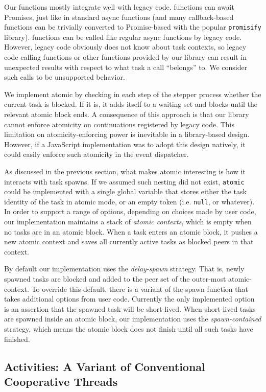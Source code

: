 \documentclass[acmsmall,anonymous,review]{acmart}\settopmatter{printfolios=true,printccs=false,printacmref=false}
\begin{document}
Our \asyncs{} functions mostly integrate well with legacy code.
\asyncs{} functions can await Promises, just like in standard async functions (and many callback-based functions can be trivially converted to Promise-based with the popular \texttt{promisify} library).
\asyncs{} functions can be called like regular async functions by legacy code.
However, legacy code obviously does not know about task contexts, so legacy code calling \asyncs{} functions or other functions provided by our library can result in unexpected results with respect to what task a call ``belongs'' to.
We consider such calls to be unsupported behavior.

We implement atomic by checking in each step of the stepper process whether the current task is blocked.
If it is, it adds itself to a waiting set and blocks until the relevant atomic block ends.
A consequence of this approach is that our library cannot enforce atomicity on continuations registered by legacy code.
This limitation on atomicity-enforcing power is inevitable in a library-based design.
However, if a JavaScript implementation was to adopt this design natively, it could easily enforce such atomicity in the event dispatcher.

As discussed in the previous section, what makes atomic interesting is how it interacts with task spawns.
If we assumed such nesting did not exist, \texttt{atomic} could be implemented with a single global variable that stores either the task identity of the task in atomic mode, or an empty token (i.e. \texttt{null}, or whatever).
In order to support a range of options, depending on choices made by user code, our implementation maintains a stack of \emph{atomic contexts}, which is empty when no tasks are in an atomic block.
When a task enters an atomic block, it pushes a new atomic context and saves all currently active tasks as blocked peers in that context.

By default our implementation uses the \emph{delay-spawn} strategy.
That is, newly spawned tasks are blocked and added to the peer set of the outer-most atomic-context.
To override this default, there is a variant of the spawn function that takes additional options from user code.
Currently the only implemented option is an assertion that the spawned task will be short-lived.
When short-lived tasks are spawned inside an atomic block, our implementation uses the \emph{spawn-contained} strategy, which means the atomic block does not finish until all such tasks have finished.

\subsection{Activities: A Variant of Conventional Cooperative Threads}
\end{document}

